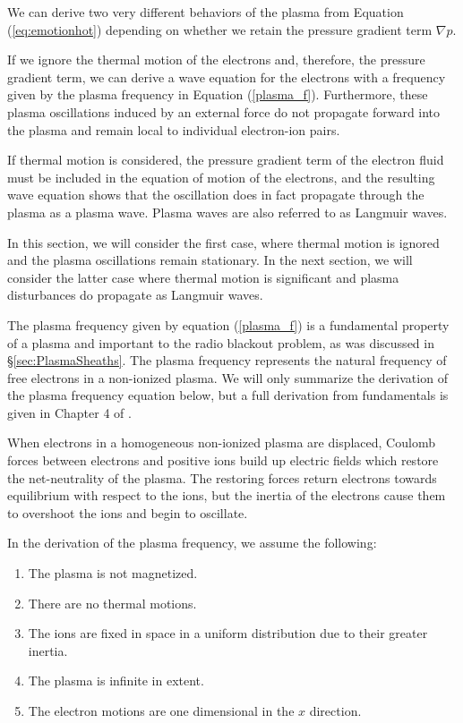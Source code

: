 \documentclass[twocolumn]{article}
\begin{document}
We can derive two very different behaviors of the plasma from Equation (\ref{eq:emotionhot}) depending on whether we retain the pressure gradient term $\nabla p$.

If we ignore the thermal motion of the electrons and, therefore, the pressure gradient term, we can derive a wave equation for the electrons with a frequency given by the plasma frequency in Equation (\ref{plasma_f}).
Furthermore, these plasma oscillations induced by an external force do not propagate forward into the plasma and remain local to individual electron-ion pairs.

If thermal motion is considered, the pressure gradient term of the electron fluid must be included in the equation of motion of the electrons, and the resulting wave equation shows that the oscillation does in fact propagate through the plasma as a plasma wave.
Plasma waves are also referred to as Langmuir waves.

In this section, we will consider the first case, where thermal motion is ignored and the plasma oscillations remain stationary.
In the next section, we will consider the latter case where thermal motion is significant and plasma disturbances do propagate as Langmuir waves.


The plasma frequency given by equation (\ref{plasma_f}) is a fundamental property of a plasma and important to the radio blackout problem, as was discussed in \S\ref{sec:PlasmaSheaths}.
The plasma frequency represents the natural frequency of free electrons in a non-ionized plasma.
We will only summarize the derivation of the plasma frequency equation below, but a full derivation from fundamentals is given in Chapter 4 of \cite{chen_introduction_1984}.

When electrons in a homogeneous non-ionized plasma are displaced, Coulomb forces between electrons and positive ions build up electric fields which restore the net-neutrality of the plasma.
The restoring forces return electrons towards equilibrium with respect to the ions, but the inertia of the electrons cause them to overshoot the ions and begin to oscillate.

In the derivation of the plasma frequency, we assume the following:
\begin{enumerate}
	\item The plasma is not magnetized.
	\item There are no thermal motions.
	\item The ions are fixed in space in a uniform distribution due to their greater inertia.
	\item The plasma is infinite in extent.
	\item The electron motions are one dimensional in the $x$ direction.
\end{enumerate}
\end{document}
